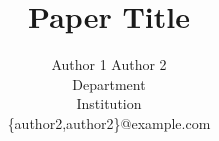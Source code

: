 \documentclass[a4paper,twocolumn,10pt]{article}
\begin{document}
\pagestyle{empty}


\newcommand{\fulltitle}[0]{Paper Title}
\title{\Large \bf \fulltitle{}}

\author{
	{\rm Author 1 \hspace{.75cm}
             Author 2} \\
	Department \\
	Institution \\
	{\footnotesize \{author2,author2\}@example.com}
}

\maketitle




\nocite{popekGoldberg}



\begingroup
\raggedright

\endgroup
\end{document}
